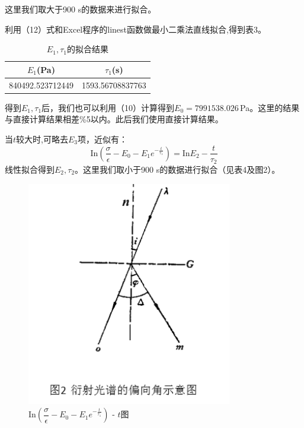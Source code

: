 \documentclass[ctex]{article}
\begin{document}
这里我们取大于900 s的数据来进行拟合。
\par 利用（12）式和Excel程序的linest函数做最小二乘法直线拟合,得到表3。
\begin{table}[htbp]
    \centering
    \begin{tabular}{|c|c|}
    \hline
        $E_1$(Pa) & $\tau_1$(s) \\ \hline
        840492.523712449   &1593.56708837763    \\ \hline
    \end{tabular}
    \caption{$E_1,\tau_1$的拟合结果}
    \label{tab:my_label}
\end{table}
\par  得到$E_1,\tau_1$后，我们也可以利用（10）计算得到$E_0=7991538.026\,$Pa。这里的结果与直接计算结果相差\%5以内。此后我们使用直接计算结果。
\par 当$t$较大时,可略去$E_3$项，近似有：
\begin{equation}
       \mathrm{In}\left(\dfrac{\sigma}{\epsilon}-E_0-E_1e^{-\frac{t}{\tau_1}}\right)=\mathrm{In}E_2-\frac{t}{\tau_2}
\end{equation}
线性拟合得到$E_2,\tau_2$。这里我们取小于900 s的数据进行拟合（见表4及图2）。\\
\begin{figure}[htbp]
    \centering
    \includegraphics[width=0.8\textwidth,height=0.5\textwidth]{图片2.png}
    \caption{$ \mathrm{In}\left(\dfrac{\sigma}{\epsilon}-E_0-E_1e^{-\frac{t}{\tau_1}}\right)$ - $t$图}
\end{figure} 
\end{document}

